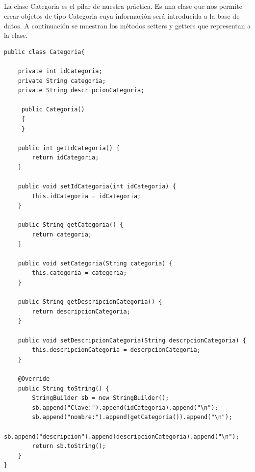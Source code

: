 \documentclass[10pt,a4paper]{article}
\begin{document}
\subsection{\color{colorESCOM}{Clase Categoria}}
\normalsize
{
La clase Categoria es el pilar de nuestra práctica. Es una clase que nos permite crear objetos
de tipo Categoria cuya información será introducida a la base de datos. A continuación se muestran
los métodos setters y getters que representan a la clase.

}
\begin{lstlisting}
public class Categoria{
     
    private int idCategoria;
    private String categoria;
    private String descripcionCategoria;
    
     public Categoria()
     {
     }

    public int getIdCategoria() {
        return idCategoria;
    }

    public void setIdCategoria(int idCategoria) {
        this.idCategoria = idCategoria;
    }

    public String getCategoria() {
        return categoria;
    }

    public void setCategoria(String categoria) {
        this.categoria = categoria;
    }

    public String getDescripcionCategoria() {
        return descripcionCategoria;
    }

    public void setDescripcionCategoria(String descrpcionCategoria) {
        this.descripcionCategoria = descrpcionCategoria;
    }

    @Override
    public String toString() {
        StringBuilder sb = new StringBuilder();
        sb.append("Clave:").append(idCategoria).append("\n");
        sb.append("nombre:").append(getCategoria()).append("\n");
        sb.append("descripcion").append(descripcionCategoria).append("\n");
        return sb.toString();
    }
}

\end{lstlisting} \hfill
\end{document}
